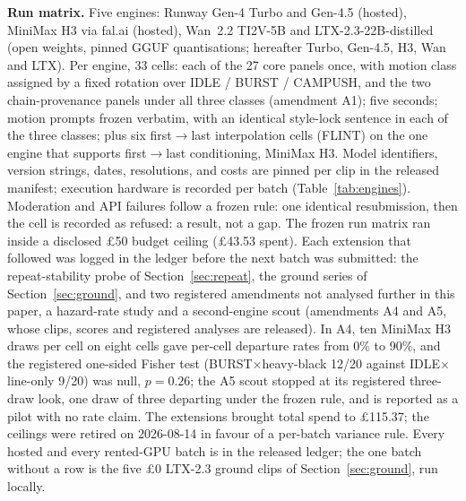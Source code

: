 \documentclass[11pt]{article}
\begin{document}
\textbf{Run matrix.} Five engines: Runway Gen-4 Turbo and Gen-4.5 (hosted),
MiniMax H3 via fal.ai (hosted), Wan~2.2 TI2V-5B and LTX-2.3-22B-distilled
(open weights, pinned GGUF quantisations; hereafter Turbo, Gen-4.5, H3, Wan
and LTX). Per engine, 33 cells: each of the 27 core panels
once, with motion class assigned by a fixed rotation over
IDLE / BURST / CAMPUSH, and the two chain-provenance panels under all three
classes (amendment A1); five seconds; motion prompts frozen verbatim, with an
identical style-lock sentence in each of the three classes; plus six first$\to$last interpolation cells
(FLINT) on the one engine that supports first$\to$last conditioning,
MiniMax H3. Model
identifiers, version strings, dates, resolutions, and costs are pinned per
clip in the released manifest; execution hardware is recorded per batch
(Table~\ref{tab:engines}). Moderation and API
failures follow a frozen rule: one identical resubmission, then the cell is
recorded as refused: a result, not a gap. The frozen run matrix ran
inside a disclosed \pounds50 budget ceiling (\pounds43.53 spent). Each
extension that followed was logged in the ledger before the next batch was
submitted: the repeat-stability probe of Section~\ref{sec:repeat}, the ground
series of Section~\ref{sec:ground}, and two registered amendments not analysed
further in this paper, a hazard-rate study and a second-engine scout
(amendments A4 and A5, whose clips, scores and registered analyses are
released). In A4, ten MiniMax H3 draws per cell on eight cells gave per-cell
departure rates from 0\% to 90\%, and the registered one-sided Fisher test
(BURST$\times$heavy-black 12/20 against IDLE$\times$line-only 9/20) was null,
$p = 0.26$; the A5 scout stopped at its registered three-draw look, one draw of
three departing under the frozen rule, and is reported as a pilot with no rate
claim. The extensions brought total spend to \pounds115.37; the ceilings were
retired on 2026-08-14 in favour of a per-batch variance rule. Every hosted and every rented-GPU batch is in the
released ledger; the one batch without a row is the five \pounds0 LTX-2.3
ground clips of Section~\ref{sec:ground}, run locally.
\end{document}
